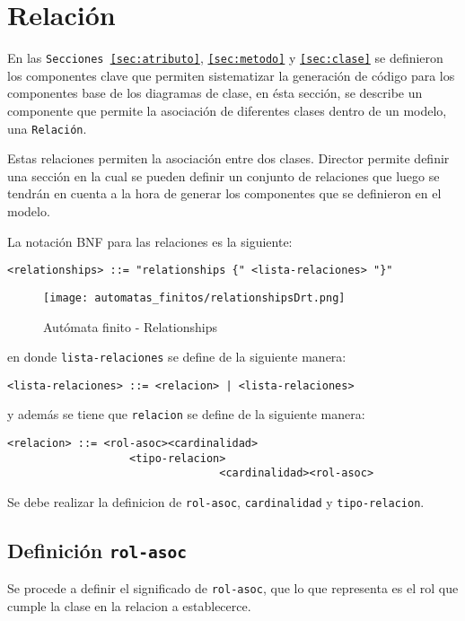 \section{Relación}
\label{sec:relacion}

En las \texttt{Secciones \ref{sec:atributo}}, \texttt{\ref{sec:metodo}} y
\texttt{\ref{sec:clase}} se definieron los componentes clave que permiten
sistematizar la generación de código para los componentes base de los
diagramas de clase, en ésta sección, se describe un componente que permite
la asociación de diferentes clases dentro de un modelo, una \texttt{Relación}.

Estas relaciones permiten la asociación entre dos clases. Director permite
definir una sección en la cual se pueden definir un conjunto de relaciones que
luego se tendrán en cuenta a la hora de generar los componentes que se
definieron en el modelo.

La notación BNF para las relaciones es la siguiente:

\begin{lstlisting}[caption={BNF - Relationships}, basicstyle=\footnotesize\ttfamily]
  <relationships> ::= "relationships {" <lista-relaciones> "}"
\end{lstlisting}

\begin{figure}[H]
	\centering
	\texttt{[image: automatas\_finitos/relationshipsDrt.png]}
	\caption{Autómata finito - Relationships}
	\label{fig:relationships}
\end{figure}

en donde \texttt{lista-relaciones} se define de la siguiente manera:

\begin{lstlisting}[basicstyle=\footnotesize\ttfamily]
  <lista-relaciones> ::= <relacion> | <lista-relaciones>
\end{lstlisting}

y además se tiene que \texttt{relacion} se define de la siguiente manera:

\begin{lstlisting}[caption={BNF - Relación}, basicstyle=\footnotesize\ttfamily]
	<relacion> ::= <rol-asoc><cardinalidad>
	               <tipo-relacion>
								 <cardinalidad><rol-asoc>
\end{lstlisting}

Se debe realizar la definicion de \texttt{rol-asoc}, \texttt{cardinalidad} y
\texttt{tipo-relacion}.

\subsection*{Definición \texttt{rol-asoc}}
Se procede a definir el significado de \texttt{rol-asoc}, que lo que representa
es el rol que cumple la clase en la relacion a establecerce.

